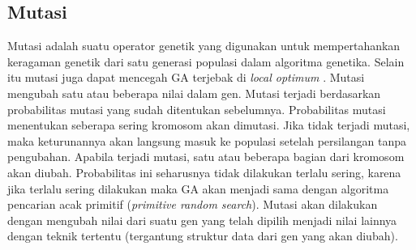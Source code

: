 \subsection{Mutasi}
\label{sub:mutation}
Mutasi adalah suatu operator genetik yang digunakan untuk mempertahankan keragaman genetik dari satu generasi populasi dalam algoritma genetika. Selain itu mutasi juga dapat mencegah GA terjebak di \textit{local optimum} \cite{sivanandam2007introduction}. Mutasi mengubah satu atau beberapa nilai dalam gen. Mutasi terjadi berdasarkan probabilitas mutasi yang sudah ditentukan sebelumnya. Probabilitas mutasi menentukan seberapa sering kromosom akan dimutasi. Jika tidak terjadi mutasi, maka keturunannya akan langsung masuk ke populasi setelah persilangan tanpa pengubahan. Apabila terjadi mutasi, satu atau beberapa bagian dari kromosom akan diubah. Probabilitas ini seharusnya tidak dilakukan terlalu sering, karena jika terlalu sering dilakukan maka GA akan menjadi sama dengan algoritma pencarian acak primitif (\textit{primitive random search}). Mutasi akan dilakukan dengan mengubah nilai dari suatu gen yang telah dipilih menjadi nilai lainnya dengan teknik tertentu (tergantung struktur data dari gen yang akan diubah).



